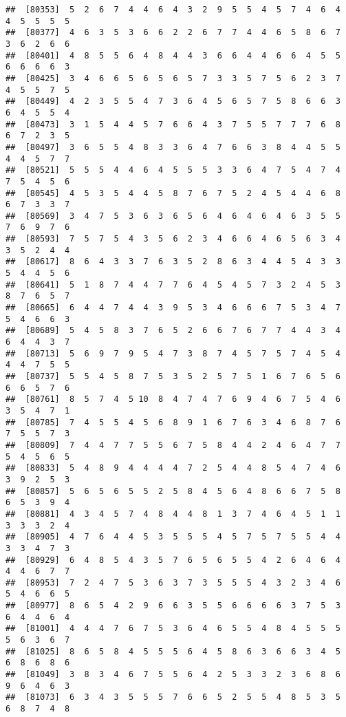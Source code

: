 \documentclass[
]{book}
\begin{document}
\begin{verbatim}
##  [80353]  5  2  6  7  4  4  6  4  3  2  9  5  5  4  5  7  4  6  4  4  5  5  5  5
##  [80377]  4  6  3  5  3  6  6  2  2  6  7  7  4  4  6  5  8  6  7  3  6  2  6  6
##  [80401]  4  8  5  5  6  4  8  4  4  3  6  6  4  4  6  6  4  5  5  6  6  6  6  3
##  [80425]  3  4  6  6  5  6  5  6  5  7  3  3  5  7  5  6  2  3  7  4  5  5  7  5
##  [80449]  4  2  3  5  5  4  7  3  6  4  5  6  5  7  5  8  6  6  3  6  4  5  5  4
##  [80473]  3  1  5  4  4  5  7  6  6  4  3  7  5  5  7  7  7  6  8  6  7  2  3  5
##  [80497]  3  6  5  5  4  8  3  3  6  4  7  6  6  3  8  4  4  5  5  4  4  5  7  7
##  [80521]  5  5  5  4  4  6  4  5  5  5  3  3  6  4  7  5  4  7  4  7  5  4  5  6
##  [80545]  4  5  3  5  4  4  5  8  7  6  7  5  2  4  5  4  4  6  8  6  7  3  3  7
##  [80569]  3  4  7  5  3  6  3  6  5  6  4  6  4  6  4  6  3  5  5  7  6  9  7  6
##  [80593]  7  5  7  5  4  3  5  6  2  3  4  6  6  4  6  5  6  3  4  3  5  2  4  4
##  [80617]  8  6  4  3  3  7  6  3  5  2  8  6  3  4  4  5  4  3  3  5  4  4  5  6
##  [80641]  5  1  8  7  4  4  7  7  6  4  5  4  5  7  3  2  4  5  3  8  7  6  5  7
##  [80665]  6  4  4  7  4  4  3  9  5  3  4  6  6  6  7  5  3  4  7  5  4  6  6  3
##  [80689]  5  4  5  8  3  7  6  5  2  6  6  7  6  7  7  4  4  3  4  6  4  4  3  7
##  [80713]  5  6  9  7  9  5  4  7  3  8  7  4  5  7  5  7  4  5  4  4  4  7  5  5
##  [80737]  5  5  4  5  8  7  5  3  5  2  5  7  5  1  6  7  6  5  6  6  6  5  7  6
##  [80761]  8  5  7  4  5 10  8  4  7  4  7  6  9  4  6  7  5  4  6  3  5  4  7  1
##  [80785]  7  4  5  5  4  5  6  8  9  1  6  7  6  3  4  6  8  7  6  7  5  5  7  3
##  [80809]  7  4  4  7  7  5  5  6  7  5  8  4  4  2  4  6  4  7  7  5  4  5  6  5
##  [80833]  5  4  8  9  4  4  4  4  7  2  5  4  4  8  5  4  7  4  6  3  9  2  5  3
##  [80857]  5  6  5  6  5  5  2  5  8  4  5  6  4  8  6  6  7  5  8  6  5  3  9  4
##  [80881]  4  3  4  5  7  4  8  4  4  8  1  3  7  4  6  4  5  1  1  3  3  3  2  4
##  [80905]  4  7  6  4  4  5  3  5  5  5  4  5  7  5  7  5  5  4  4  3  3  4  7  3
##  [80929]  6  4  8  5  4  3  5  7  6  5  6  5  5  4  2  6  4  6  4  4  4  6  7  7
##  [80953]  7  2  4  7  5  3  6  3  7  3  5  5  5  4  3  2  3  4  6  5  4  6  6  5
##  [80977]  8  6  5  4  2  9  6  6  3  5  5  6  6  6  6  3  7  5  3  6  4  4  6  4
##  [81001]  4  4  4  7  6  7  5  3  6  4  6  5  5  4  8  4  5  5  5  5  6  3  6  7
##  [81025]  8  6  5  8  4  5  5  5  6  4  5  8  6  3  6  6  3  4  5  6  8  6  8  6
##  [81049]  3  8  3  4  6  7  5  5  6  4  2  5  3  3  2  3  6  8  6  9  6  4  6  3
##  [81073]  6  3  4  3  5  5  5  7  6  6  5  2  5  5  4  8  5  3  5  6  8  7  4  8

\end{verbatim}
\end{document}

